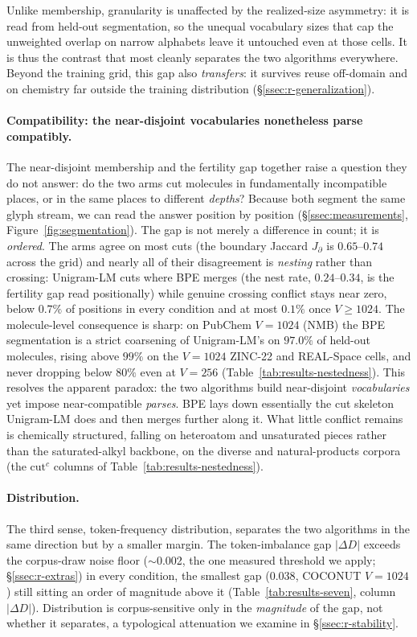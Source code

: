 \documentclass{article}
\begin{document}
Unlike membership, granularity is unaffected by the realized-size asymmetry: it
is read from held-out segmentation, so the unequal
vocabulary sizes that cap the unweighted overlap on narrow alphabets leave it
untouched even at those cells. It is thus the contrast that most cleanly
separates the two algorithms everywhere. Beyond the training grid, this gap also
\emph{transfers}: it survives reuse
off-domain and on chemistry far outside the training distribution
(\S\ref{ssec:r-generalization}).

\paragraph{Compatibility: the near-disjoint vocabularies nonetheless parse
compatibly.}
The near-disjoint membership and the fertility gap together raise a question they
do not answer: do the two arms cut molecules in fundamentally incompatible places,
or in the same places to different \emph{depths}? Because both segment the same
glyph stream, we can read the answer position by position
(\S\ref{ssec:measurements}, Figure~\ref{fig:segmentation}). The gap is not merely a
difference in count; it is \emph{ordered}. The arms agree on most cuts (the
boundary Jaccard $J_{\partial}$ is $0.65$--$0.74$ across the grid) and nearly all
of their disagreement is \emph{nesting} rather than crossing: Unigram-LM cuts where
BPE merges (the nest rate, $0.24$--$0.34$, is the fertility gap read positionally)
while genuine crossing conflict stays near zero, below $0.7\%$ of positions in
every condition and at most $0.1\%$ once $V{\ge}1024$. The molecule-level
consequence is sharp: on PubChem $V{=}1024$ (NMB) the BPE segmentation is a strict
coarsening of Unigram-LM's on $97.0\%$ of held-out molecules, rising above $99\%$
on the $V{=}1024$ ZINC-22 and REAL-Space cells, and never dropping below $80\%$
even at $V{=}256$ (Table~\ref{tab:results-nestedness}). This resolves the apparent
paradox: the two algorithms build near-disjoint \emph{vocabularies} yet impose
near-compatible \emph{parses}. BPE lays down essentially the cut skeleton Unigram-LM does
and then merges further along it. What little conflict remains is chemically
structured, falling on heteroatom and unsaturated pieces rather than the
saturated-alkyl backbone, on the diverse and natural-products corpora (the
$\mathrm{cut}^{c}$ columns of Table~\ref{tab:results-nestedness}).

\paragraph{Distribution.}
The third sense, token-frequency distribution, separates the two algorithms in
the same direction but by a smaller margin. The token-imbalance gap
$|\Delta D|$ exceeds the corpus-draw noise floor ($\sim$0.002, the one measured
threshold we apply; \S\ref{ssec:r-extras}) in every condition, the smallest
gap ($0.038$, COCONUT $V{=}1024$) still sitting an order of magnitude above it
(Table~\ref{tab:results-seven}, column $|\Delta D|$).
Distribution is corpus-sensitive only in the \emph{magnitude} of the
gap, not whether it separates, a typological attenuation we examine in
\S\ref{ssec:r-stability}.
\end{document}

